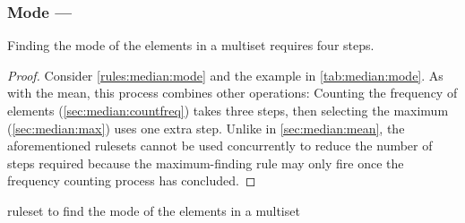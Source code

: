 \subsubsection{Mode --- }  \label{sec:median:mode}

\begin{proposition}\label{prop:median:mode}
Finding the mode of the elements in a multiset requires four steps.
\end{proposition}

\begin{proof}
Consider \cref{rules:median:mode} and the example in \cref{tab:median:mode}.  As with the mean, this process combines other operations:  Counting the frequency of elements (\cref{sec:median:countfreq}) takes three steps, then selecting the maximum (\cref{sec:median:max}) uses one extra step.  Unlike in \cref{sec:median:mean}, the aforementioned \glspl{ruleset} cannot be used concurrently to reduce the number of steps required because the maximum-finding rule may only fire once the frequency counting process has concluded.
\end{proof}

\begin{cprulesetfloat}
\begin{cpruleset}




\end{cpruleset}
\caption{\label{rules:median:mode}\Gls{ruleset} to find the mode of the elements in a multiset}
\end{cprulesetfloat}

